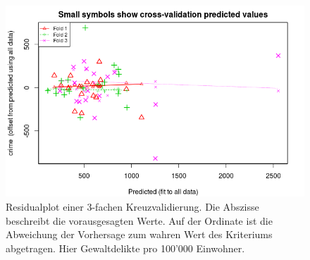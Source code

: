 \begin{figure}[hbtp]
\centering
\includegraphics[width=\textwidth]{cvlm.png}
\caption{Residualplot einer 3-fachen Kreuzvalidierung. Die Abszisse beschreibt die vorausgesagten Werte. Auf der Ordinate ist die Abweichung der Vorhersage zum wahren Wert des Kriteriums abgetragen. Hier Gewaltdelikte pro 100'000 Einwohner.}
\label{plot:cvlm}
\end{figure}